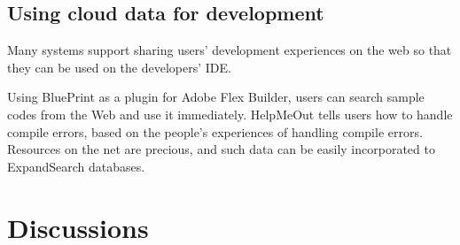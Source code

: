 \documentclass[manuscript,anonymous,review]{acmart}
\def\ES{\textsf{ExpandSearch}}
\begin{document}

\subsection{Using cloud data for development}


Many systems support sharing users' development experiences on the web so that
they can be used on the developers' IDE.

Using BluePrint\cite{Brandt:2010:EPI:1753326.1753402}
as a plugin for Adobe Flex Builder,
users can search sample codes from the Web and use it immediately.
%
HelpMeOut\cite{Hartmann:2010:OPS:1753326.1753478} tells users
how to handle compile errors,
based on the people's experiences of handling compile errors.
%
Resources on the net are precious, and such data can be
easily incorporated to {\ES} databases.


% 
% 
% 

\section{Discussions}
\end{document}
